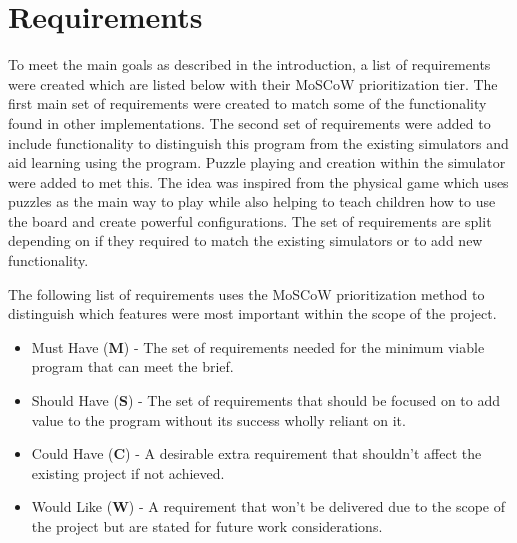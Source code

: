 \documentclass{l4proj}
\begin{document}
\section{Requirements}
To meet the main goals as described in the introduction, a list of requirements were created which are listed below with their MoSCoW \citep{noauthor_moscow_nodate} prioritization tier. The first main set of requirements were created to match some of the functionality found in other implementations. The second set of requirements were added to include functionality to distinguish this program from the existing simulators and aid learning using the program. Puzzle playing and creation within the simulator were added to met this. The idea was inspired from the physical game which uses puzzles as the main way to play while also helping to teach children how to use the board and create powerful configurations. The set of requirements are split depending on if they required to match the existing simulators or to add new functionality.

The following list of requirements uses the MoSCoW prioritization method to distinguish which features were most important within the scope of the project. 
\begin{itemize}
    \item Must Have (\textbf{M}) - The set of requirements needed for the minimum viable program that can meet the brief.
    \item Should Have (\textbf{S}) - The set of requirements that should be focused on to add value to the program without its success wholly reliant on it.
    \item Could Have (\textbf{C}) - A desirable extra requirement that shouldn't affect the existing project if not achieved.
    \item Would Like (\textbf{W}) - A requirement that won't be delivered due to the scope of the project but are stated for future work considerations.
\end{itemize}
\end{document}
